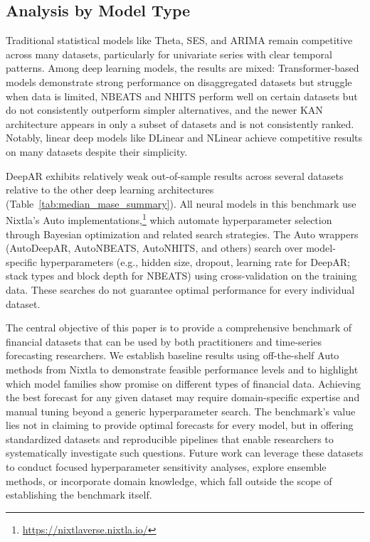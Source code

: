 \documentclass{article}
\begin{document}
\subsection{Analysis by Model Type}

Traditional statistical models like Theta, SES, and ARIMA remain competitive across many datasets, particularly for univariate series with clear temporal patterns. Among deep learning models, the results are mixed: Transformer-based models demonstrate strong performance on disaggregated datasets but struggle when data is limited, NBEATS and NHITS perform well on certain datasets but do not consistently outperform simpler alternatives, and the newer KAN architecture appears in only a subset of datasets and is not consistently ranked. Notably, linear deep models like DLinear and NLinear achieve competitive results on many datasets despite their simplicity.

DeepAR exhibits relatively weak out-of-sample results across several datasets relative to the other deep learning architectures (Table~\ref{tab:median_mase_summary}). All neural models in this benchmark use Nixtla's Auto implementations,\footnote{\url{https://nixtlaverse.nixtla.io/}} which automate hyperparameter selection through Bayesian optimization and related search strategies. The Auto wrappers (AutoDeepAR, AutoNBEATS, AutoNHITS, and others) search over model-specific hyperparameters (e.g., hidden size, dropout, learning rate for DeepAR; stack types and block depth for NBEATS) using cross-validation on the training data. These searches do not guarantee optimal performance for every individual dataset.

The central objective of this paper is to provide a comprehensive benchmark of financial datasets that can be used by both practitioners and time-series forecasting researchers. We establish baseline results using off-the-shelf Auto methods from Nixtla to demonstrate feasible performance levels and to highlight which model families show promise on different types of financial data. Achieving the best forecast for any given dataset may require domain-specific expertise and manual tuning beyond a generic hyperparameter search. The benchmark's value lies not in claiming to provide optimal forecasts for every model, but in offering standardized datasets and reproducible pipelines that enable researchers to systematically investigate such questions. Future work can leverage these datasets to conduct focused hyperparameter sensitivity analyses, explore ensemble methods, or incorporate domain knowledge, which fall outside the scope of establishing the benchmark itself.
\end{document}
